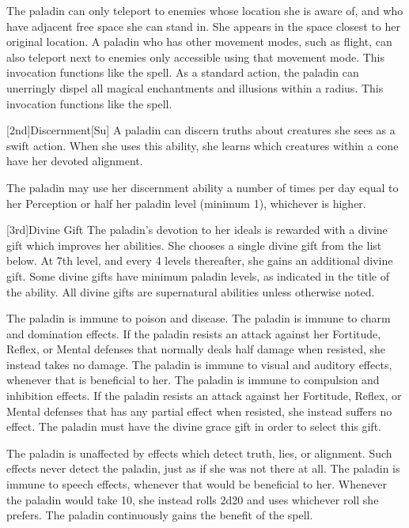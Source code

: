 The paladin can only teleport to enemies whose location she is aware of, and who have adjacent free space she can stand in.
She appears in the space closest to her original location.
A paladin who has other movement modes, such as flight, can also teleport next to enemies only accessible using that movement mode.
 This invocation functions like the 
spell.
As a standard action, the paladin can unerringly dispel all magical enchantments and illusions within a \arealarge radius.
 This invocation functions like the 
spell.

[2nd]{Discernment}[Su]
A paladin can discern truths about creatures she sees as a swift action.
When she uses this ability, she learns which creatures within a \arealarge cone have her devoted alignment.

The paladin may use her discernment ability a number of times per day equal to her Perception or half her paladin level (minimum 1), whichever is higher.

[3rd]{Divine Gift}
The paladin's devotion to her ideals is rewarded with a divine gift which improves her abilities.
She chooses a single divine gift from the list below.
At 7th level, and every 4 levels thereafter, she gains an additional divine gift.
Some divine gifts have minimum paladin levels, as indicated in the title of the ability.
All divine gifts are supernatural abilities unless otherwise noted.

The paladin is immune to poison and disease.
The paladin is immune to charm and domination effects.
If the paladin resists an attack against her Fortitude, Reflex, or Mental defenses that normally deals half damage when resisted, she instead takes no damage.
The paladin is immune to visual and auditory effects, whenever that is beneficial to her.
The paladin is immune to compulsion and inhibition effects.
If the paladin resists an attack against her Fortitude, Reflex, or Mental defenses that has any partial effect when resisted, she instead suffers no effect.
The paladin must have the divine grace gift in order to select this gift.

The paladin is unaffected by effects which detect truth, lies, or alignment.
Such effects never detect the paladin, just as if she was not there at all.
The paladin is immune to speech effects, whenever that would be beneficial to her.
Whenever the paladin would take 10, she instead rolls 2d20 and uses whichever roll she prefers.
 The paladin continuously gains the benefit of the 
spell.

